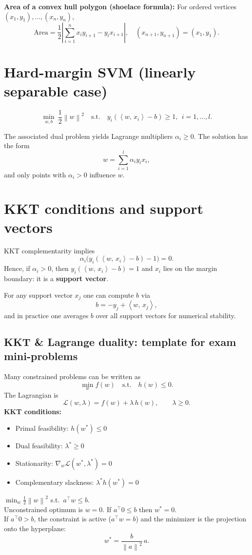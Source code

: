 \documentclass[11pt, oneside]{book}
\newcommand{\norm}[1]{\left\lVert #1 \right\rVert}
\newcommand{\inner}[2]{\left\langle #1,\, #2 \right\rangle}
\newcommand{\1}{\ind}                       %
\newcommand{\ip}[2]{\inner{#1}{#2}}        %
\begin{document}
\textbf{Area of a convex hull polygon (shoelace formula):}
For ordered vertices $(x_1,y_1),\dots,(x_n,y_n)$,
\[
\mathrm{Area}=\frac12\left|\sum_{i=1}^{n} x_i y_{i+1}-y_i x_{i+1}\right|,
\quad (x_{n+1},y_{n+1})=(x_1,y_1).
\]

\section{Hard-margin SVM (linearly separable case)}
\begin{thmbox}[title={Primal Hard-Margin SVM}]
\[
\min_{w,b}\ \frac12\norm{w}^2
\quad\text{s.t.}\quad
y_i(\ip{w}{x_i}-b)\ge 1,\ \ i=1,\dots,l.
\]
\end{thmbox}

The associated dual problem yields Lagrange multipliers $\alpha_i\ge 0$.
The solution has the form
\[
  w=\sum_{i=1}^{l}\alpha_i y_i x_i,
\]
and only points with $\alpha_i>0$ influence $w$.

\section{KKT conditions and support vectors}
KKT complementarity implies
\[
  \alpha_i\big(y_i(\ip{w}{x_i}-b)-1\big)=0.
\]
Hence, if $\alpha_i>0$, then $y_i(\ip{w}{x_i}-b)=1$ and $x_i$ lies on the margin boundary: it is a \textbf{support vector}.

For any support vector $x_j$ one can compute $b$ via
\[
  b = -y_j+\ip{w}{x_j},
\]
and in practice one averages $b$ over all support vectors for numerical stability.

\subsection{KKT \& Lagrange duality: template for exam mini-problems}
Many constrained problems can be written as
\[
\min_w f(w)\quad\text{s.t.}\quad h(w)\le 0.
\]
The Lagrangian is
\[
\mathcal{L}(w,\lambda)=f(w)+\lambda\,h(w),\qquad \lambda\ge 0.
\]
\textbf{KKT conditions:}
\begin{itemize}
  \item Primal feasibility: $h(w^*)\le 0$
  \item Dual feasibility: $\lambda^*\ge 0$
  \item Stationarity: $\nabla_w \mathcal{L}(w^*,\lambda^*)=0$
  \item Complementary slackness: $\lambda^* h(w^*)=0$
\end{itemize}

\begin{thmbox}[title={KKT: Constrained Minimization onto Hyperplane}]
$\min_w \frac12\norm{w}^2$ s.t.\ $a^\top w\le b$.\\
Unconstrained optimum is $w=0$. If $a^\top 0\le b$ then $w^*=0$.\\
If $a^\top 0> b$, the constraint is active ($a^\top w=b$) and the minimizer is the projection onto the hyperplane:
\[
w^*=\frac{b}{\norm{a}^2}\,a.
\]
\end{thmbox}
\end{document}
